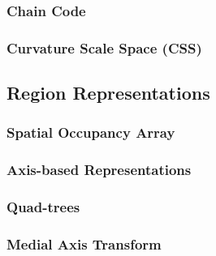 \documentclass{article}
\begin{document}
\subsubsection{Chain Code}
\subsubsection{Curvature Scale Space (CSS)}

\subsection{Region Representations}
\subsubsection{Spatial Occupancy Array}
\subsubsection{Axis-based Representations}
\subsubsection{Quad-trees}
\subsubsection{Medial Axis Transform}

\end{document}

